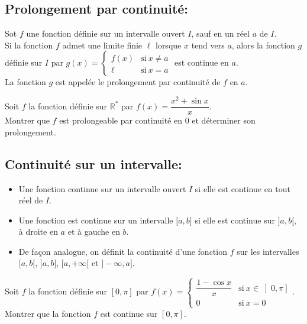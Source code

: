 \documentclass[12pt,a4paper,x11names,usenames,dvipsnames,svgnames,oneside]{book}
\def\R{\mathbb{R}}
\begin{document}
\subsection{Prolongement par continuité:}
\begin{thr}
Sot $f$ une fonction définie sur un intervalle ouvert $I$, sauf en un réel $a$ de $I$.\\
Si la fonction $f$  admet une limite finie $\ell$ lorsque $x$ tend vers $a$, alors la fonction $g$ définie sur $I$ par $g(x)=\left\lbrace \begin{array}{ll}
f(x)&\text{si}~x\neq a\\
\ell &\text{si}~x=a

\end{array} \right. $ est continue en $a$.\\
La fonction $g$ est appelée le prolongement par continuité de $f$ en $a$.
\end{thr}
\begin{act}
Soit $f$ la fonction définie sur $\R^*$ par $f(x)=\dfrac{x^2+\sin x}{x}$.\\
Montrer que $f$ est prolongeable par continuité en $0$ et déterminer son prolongement.
\end{act}
\subsection{Continuité sur un intervalle:}
\begin{df}
\begin{itemize}
\item Une fonction continue sur un intervalle ouvert $I$ si elle est continue en tout réel de $I$.
\item Une fonction est continue sur un intervalle $\big[a, b\big]$ si elle est continue sur $\big]a, b\big[$, à droite en $a$ et à gauche en $b$.
\item De façon analogue, on définit la continuité d'une fonction $f$ sur les intervalles $\big[a, b\big[$, $\big]a,b\big]$, $\big[a, +\infty\big[$ et $\big]-\infty, a\big]$.

\end{itemize}
\end{df}
\begin{act}
Soit $f$ la fonction définie sur $\left[0,\pi \right]$ par $f(x)=\left\lbrace \begin{array}{ll}
\dfrac{1-\cos x}{x}&\text{si}~x\in\left]0,\pi\right]\\
0&\text{si}~x=0

\end{array} \right.$.\\
Montrer que la fonction $f$ est continue sur $\left[0,\pi\right]$.
\end{act}
\end{document}
